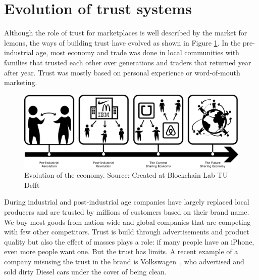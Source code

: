 \section{Evolution of trust systems}
Although the role of trust for marketplaces is well described by the market for lemons, the ways of 
building trust have evolved as shown in Figure \ref{fig:economy}. In the pre-industrial age, most economy and trade was done in local
communities with families that trusted each other over generations and traders that returned year
after year. Trust was mostly based on personal experience or word-of-mouth marketing. 

\begin{figure}[h]
    \centering
    \includegraphics[width=\textwidth]{images/economy.png}
    \caption{Evolution of the economy. Source: Created at Blockchain Lab TU Delft}
    \label{fig:economy}
\end{figure}

During industrial and post-industrial age companies have largely replaced local producers and are 
trusted by millions of customers based on their brand name. We buy most goods from nation wide and 
global companies that are competing with few other competitors. Trust is build through advertisements
and product quality but also the effect of masses plays a role: if many people have an iPhone, even 
more people want one. But the trust has limits. A recent example of a company misusing the trust in 
the brand is Volkswagen~\cite{VWDiesel}, who advertised and sold dirty Diesel cars under the cover 
of being clean. 

